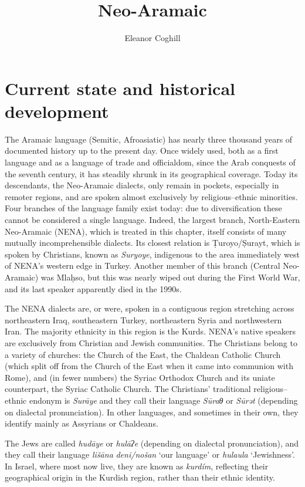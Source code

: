 \documentclass[output=paper]{langsci/langscibook}
\author{Eleanor Coghill\affiliation{Uppsala University}}
\title{Neo-Aramaic}
\begin{document}
\section{Current state and historical development}

The Aramaic language (Semitic, Afroasiatic) has nearly three thousand years of documented history up to the present day. Once widely used, both as a first language and as a language of trade and officialdom, since the Arab conquests of the seventh century, it has steadily shrunk in its geographical coverage. Today its descendants, the Neo-Aramaic dialects, only remain in pockets, especially in remoter regions, and are spoken almost exclusively by religious–ethnic minorities. Four branches of the language family exist today: due to diversification these cannot be considered a single language. Indeed, the largest branch, North-Eastern Neo-Aramaic (NENA), which is treated in this chapter, itself consists of many mutually incomprehensible dialects. Its closest relation is Ṭuroyo/Ṣurayt, which is spoken by Christians, known as \textit{Suryoye}, indigenous to the area immediately west of NENA’s western edge in Turkey. Another member of this branch (Central Neo-Aramaic) was Mlaḥso, but this was nearly wiped out during the First World War, and its last speaker apparently died in the 1990s. 

The NENA dialects are, or were, spoken in a contiguous region stretching across northeastern Iraq, southeastern Turkey, northeastern Syria and northwestern Iran. The majority ethnicity in this region is the Kurds. NENA’s native speakers are exclusively from Christian and Jewish communities. The Christians belong to a variety of churches: the Church of the East, the Chaldean Catholic Church (which split off from the Church of the East when it came into communion with Rome), and (in fewer numbers) the Syriac Orthodox Church and its uniate counterpart, the Syriac Catholic Church. The Christians’ traditional religious–ethnic endonym is \textit{Surāye} and they call their language \textit{Sūraθ} or \textit{Sūrət} (depending on dialectal pronunciation). In other languages, and sometimes in their own, they identify mainly as Assyrians or Chaldeans.

The Jews are called \textit{hudāye} or \textit{hulāʔe} (depending on dialectal pronunciation), and they call their language \textit{lišāna} \textit{deni/nošan} ‘our language’ or \textit{hulaula} ‘Jewishness’. In Israel, where most now live, they are known as \textit{kurdím}, reflecting their geographical origin in the Kurdish region, rather than their ethnic identity.
\end{document}
